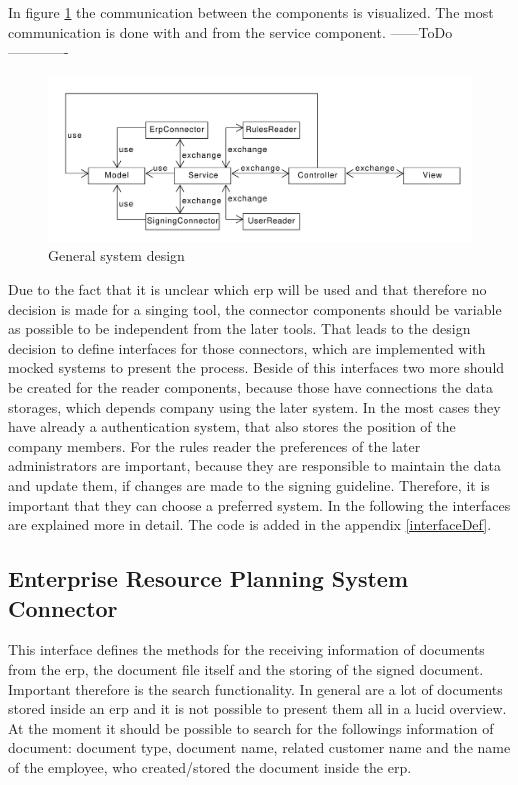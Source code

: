 
In figure \ref{fig:generalDesign} the communication between the components is visualized.
The most communication is done with and from the service component. 
------ToDo-------------

\begin{figure}[h!]
	\includegraphics[width=\linewidth]{./design/images/generalCommunication.pdf}
	\centering
	\caption{General system design}
	\label{fig:generalDesign}
\end{figure}

Due to the fact that it is unclear which \gls{erp} will be used and that therefore no decision is made for a singing tool, the connector components should be variable as possible to be independent from the later tools. That leads to the design decision to define interfaces for those connectors, which are implemented with mocked systems to present the process. \newline
Beside of this interfaces two more should be created for the reader components, because those have connections the data storages, which depends company using the later system. In the most cases they have already a authentication system, that also stores the position of the company members. For the rules reader the preferences of the later administrators are important, because they are responsible to maintain the data and update them, if changes are made to the signing guideline. Therefore, it is important that they can choose a preferred system. In the following the interfaces are explained more in detail. The code is added in the appendix \ref{interfaceDef}.

\subsection*{Enterprise Resource Planning System Connector}
This interface defines the methods for the receiving information of documents from the \gls{erp}, the document file itself and the storing of the signed document. Important therefore is the search functionality. In general are a lot of documents stored inside an \gls{erp} and it is not possible to present them all in a lucid overview. At the moment it should be possible to search for the followings information of document: document type, document name, related customer name and the name of the employee, who created/stored the document inside the \gls{erp}.

